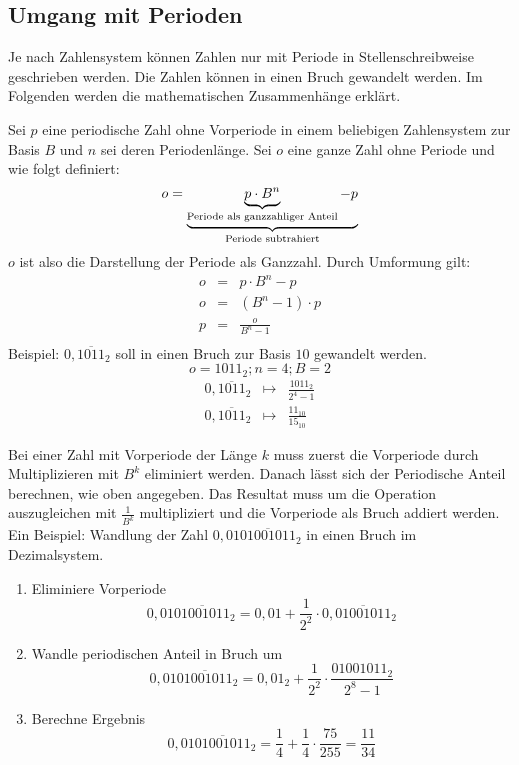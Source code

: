\subsection{Umgang mit Perioden}
Je nach Zahlensystem können Zahlen nur mit Periode in Stellenschreibweise geschrieben werden. Die Zahlen können in einen Bruch gewandelt werden. Im Folgenden werden die mathematischen Zusammenhänge erklärt.

Sei $p$ eine periodische Zahl ohne Vorperiode in einem beliebigen Zahlensystem zur Basis $B$ und $n$ sei deren Periodenlänge. Sei $o$ eine ganze Zahl ohne Periode und wie folgt definiert:
$$
	o = \underbrace{\underbrace{p \cdot B^n}_\textnormal{Periode als ganzzahliger Anteil} - p}_\textnormal{Periode subtrahiert}
$$
$o$ ist also die Darstellung der Periode als Ganzzahl. Durch Umformung gilt:
\begin{eqnarray*}
	o & = & p \cdot B^n - p \\
	o & = & (B^n - 1) \cdot p \\
	p & = & \frac{o}{B^n - 1}\\	
\end{eqnarray*}
Beispiel: $0,\overline{1011}_2$ soll in einen Bruch zur Basis $10$ gewandelt werden.
$$ o = 1011_2; n = 4; B = 2 $$
\begin{eqnarray*}
	0,\overline{1011}_2 & \mapsto & \frac{1011_2}{2^4 - 1} \\
	0,\overline{1011}_2 & \mapsto & \frac{11_{10}}{15_{10}}
\end{eqnarray*}

Bei einer Zahl mit Vorperiode der Länge $k$ muss zuerst die Vorperiode durch Multiplizieren mit $B^k$ eliminiert werden. Danach lässt sich der Periodische Anteil berechnen, wie oben angegeben. Das Resultat muss um die Operation auszugleichen mit $\frac{1}{B^k}$ multipliziert und die Vorperiode als Bruch addiert werden. Ein Beispiel: Wandlung der Zahl $0,01\overline{01001011}_2$ in einen Bruch im Dezimalsystem.
\begin{enumerate}
\item
	Eliminiere Vorperiode
	$$ 0,01\overline{01001011}_2 = 0,01 
		+ \frac{1}{2^2} \cdot 0,\overline{01001011}_2$$

\item
	Wandle periodischen Anteil in Bruch um
	$$ 0,01\overline{01001011}_2 = 0,01_2 
		+ \frac{1}{2^2} \cdot \frac{01001011_2}{2^8 - 1}$$
		
\item
	Berechne Ergebnis
	$$ 0,01\overline{01001011}_2 = \frac{1}{4} 
		+ \frac{1}{4} \cdot \frac{75}{255} = \frac{11}{34}$$
\end{enumerate}

